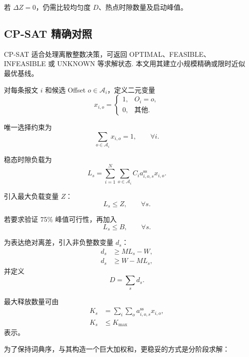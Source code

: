 \documentclass[UTF8,12pt,a4paper]{ctexart}
\newcommand{\Oset}{\mathcal{A}}
\begin{document}
若 $\Delta Z=0$，仍需比较均匀度 $D$、热点时隙数量及启动峰值。

\subsection{CP-SAT 精确对照}

CP-SAT 适合处理离散整数决策，可返回 OPTIMAL、FEASIBLE、INFEASIBLE 或 UNKNOWN 等求解状态\cite{ortools}. 本文用其建立小规模精确或限时近似最优基线。

对每条报文 $i$ 和候选 Offset $o\in\Oset_i$，定义二元变量
\begin{equation}
 x_{i,o}=\begin{cases}
 1,& O_i=o,\\
 0,& \text{其他}.
 \end{cases}
\end{equation}

唯一选择约束为
\begin{equation}
 \sum_{o\in\Oset_i}x_{i,o}=1,
 \qquad \forall i.
\label{eq:cp-one}
\end{equation}

稳态时隙负载为
\begin{equation}
 L_s=\sum_{i=1}^{N}\sum_{o\in\Oset_i}
 C_i a^{\mathrm{ss}}_{i,o,s}x_{i,o}.
\label{eq:cp-load}
\end{equation}

引入最大负载变量 $Z$：
\begin{equation}
 L_s\le Z,\qquad \forall s.
\label{eq:cp-z}
\end{equation}

若要求验证 75\% 峰值可行性，再加入
\begin{equation}
 L_s\le B,\qquad \forall s.
\label{eq:cp-hard}
\end{equation}

为表达绝对离差，引入非负整数变量 $d_s$：
\begin{align}
 d_s&\ge M L_s-W,\\
 d_s&\ge W-M L_s,
\end{align}
并定义
\begin{equation}
 D=\sum_s d_s.
\end{equation}

最大释放数量可由
\begin{align}
 K_s&=\sum_i\sum_o a^{\mathrm{ss}}_{i,o,s}x_{i,o},\\
 K_s&\le K_{\max}
\end{align}
表示。

为了保持词典序，与其构造一个巨大加权和，更稳妥的方式是分阶段求解：
\end{document}
